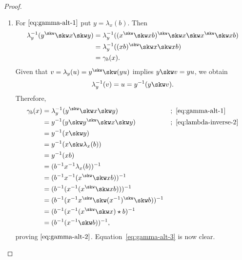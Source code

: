 \begin{proof}${}$
    \begin{enumerate}[\rm a)]
        \item For $\eqref{eq:gamma-alt-1}$ put $y=\lambda_x(b)$. Then
            \begin{align*}
                \lambda_y^{-1}(y^\skw\skw x\skw y)
                    &= \lambda_y^{-1}((x^\skw\skw xb)^\skw
                        \skw x\skw x^\skw\skw xb)\\
                    &= \lambda_y^{-1}((xb)^\skw\skw x\skw xb)\\
                    &= \gamma_b(x).
            \end{align*}
    Given that $v = \lambda_y(u) = y^\skw\skw (yu)$ implies $y\skw v = yu$,
    we obtain
    \begin{equation}\label{eq:lambda-inverse-2}
        \lambda_y^{-1}(v) = u = y^{-1}(y\skw v).
    \end{equation}
    Therefore,
    \begin{align*}
        \gamma_b(x) &= \lambda_y^{-1}(y^\skw\skw x\skw y)
                &&;\ \eqref{eq:gamma-alt-1}\\
            &= y^{-1}(y\skw y^\skw\skw x\skw y)
                &&;\ \eqref{eq:lambda-inverse-2}\\
            &= y^{-1}(x\skw y)\\
            &= y^{-1}(x\skw \lambda_x(b))\\
            &= y^{-1}(xb)\\
            &= (b^{-1}x^{-1}\lambda_x(b))^{-1}\\
            &= (b^{-1}x^{-1}(x^\skw\skw xb))^{-1}\\
            &= (b^{-1}(x^{-1}(x^\skw\skw xb)))^{-1}\\
            &= (b^{-1}(x^{-1}x^\skw\skw(x^{-1})^\skw\skw b))^{-1}\\
            &= (b^{-1}(x^{-1}(x^\skw\skw x)\star b)^{-1}\\
            &= (b^{-1}(x^{-1}\skw b))^{-1},
    \end{align*}
    proving $\eqref{eq:gamma-alt-2}$. Equation~\eqref{eq:gamma-alt-3} is now clear.


\end{enumerate}
\end{proof}
